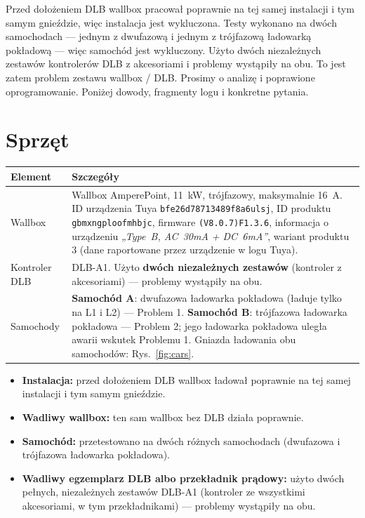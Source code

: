 \documentclass[11pt,a4paper]{article}
\begin{document}
Przed dołożeniem DLB wallbox pracował poprawnie na tej samej instalacji i tym samym gnieździe, więc instalacja jest wykluczona. Testy wykonano na dwóch samochodach — jednym z dwufazową i jednym z trójfazową ładowarką pokładową — więc samochód jest wykluczony. Użyto dwóch niezależnych zestawów kontrolerów DLB z akcesoriami i problemy wystąpiły na obu. To jest zatem problem zestawu wallbox / DLB. Prosimy o analizę i poprawione oprogramowanie. Poniżej dowody, fragmenty logu i konkretne pytania.

\section{Sprzęt}

\begin{longtable}{>{\raggedright\arraybackslash}p{3.2cm}>{\raggedright\arraybackslash}p{12.9cm}}
\toprule
\rowcolor{aphead}\textbf{Element} & \textbf{Szczegóły} \\
\midrule\endhead
\bottomrule\endfoot
Wallbox & Wallbox AmperePoint, 11~kW, trójfazowy, maksymalnie 16~A. ID urządzenia Tuya \texttt{bfe26d78713489f8a6ulsj}, ID produktu \texttt{gbmxngploofmhbjc}, firmware \texttt{(V8.0.7)F1.3.6}, informacja o urządzeniu \emph{„Type~B, AC~30mA + DC~6mA”}, wariant produktu 3 (dane raportowane przez urządzenie w logu Tuya). \\
Kontroler DLB & DLB-A1. Użyto \textbf{dwóch niezależnych zestawów} (kontroler z akcesoriami) — problemy wystąpiły na obu. \\
Samochody & \textbf{Samochód A}: dwufazowa ładowarka pokładowa (ładuje tylko na L1 i L2) — Problem 1. \textbf{Samochód B}: trójfazowa ładowarka pokładowa — Problem 2; jego ładowarka pokładowa uległa awarii wskutek Problemu 1. Gniazda ładowania obu samochodów: Rys.~\ref{fig:cars}. \\
\end{longtable}

\begin{apbox}[Co wykluczono]
\begin{itemize}
\item \textbf{Instalacja:} przed dołożeniem DLB wallbox ładował poprawnie na tej samej instalacji i tym samym gnieździe.
\item \textbf{Wadliwy wallbox:} ten sam wallbox bez DLB działa poprawnie.
\item \textbf{Samochód:} przetestowano na dwóch różnych samochodach (dwufazowa i trójfazowa ładowarka pokładowa).
\item \textbf{Wadliwy egzemplarz DLB albo przekładnik prądowy:} użyto dwóch pełnych, niezależnych zestawów DLB-A1 (kontroler ze wszystkimi akcesoriami, w tym przekładnikami) — problemy wystąpiły na obu.
\end{itemize}
\end{apbox}
\end{document}
